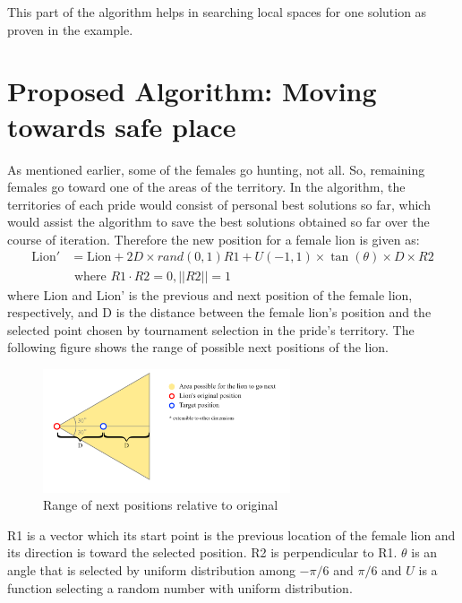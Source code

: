 This part of the algorithm helps in searching local spaces for one solution as proven in the example.

\section{Proposed Algorithm: Moving towards safe place}

As mentioned earlier, some of the females go hunting, not all. So, remaining females go toward one of the areas of the territory. In the algorithm, the territories of each pride would consist of personal best solutions so far, which would assist the algorithm to save the best solutions obtained so far over the course of iteration.
Therefore the new position for a female lion is given as:
\begin{align*}
\text{Lion}' &= \text{Lion} + 2D \times rand(0,1){R1} + U(-1,1) \times \tan(\theta) \times D \times {R2} \\
&\text{  where } R1 \cdot R2 = 0, ||R2|| = 1
\end{align*}
where Lion and Lion' is the previous and next position of the female lion, respectively, and D is the distance between the female lion's position and the selected point chosen by tournament selection in the pride's territory. The following figure shows the range of possible next positions of the lion.

\begin{figure}[h]
\begin{center}
\includegraphics[width=0.65\textwidth]{img/moving/moving}
\caption{Range of next positions relative to original}
\end{center}
\end{figure}

{R1} is a vector which its start point is the previous location of the female lion and its direction is toward the selected position. {R2} is perpendicular to {R1}. $\theta$ is an angle that is selected by uniform distribution among $-\pi/6$ and $\pi/6$ and $U$ is a function selecting a random number with uniform distribution.

